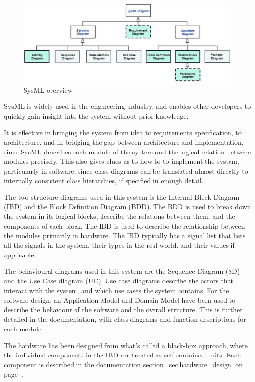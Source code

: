 \begin{figure}[H]
	\centering
	\includegraphics[max width=1\linewidth]{SysML.png}
	\caption{SysML overview\cite{SysML}}
	\label{fig:SysML}
\end{figure}

SysML is widely used in the engineering industry, and enables other developers to quickly gain insight into the system without prior knowledge. 

It is effective in bringing the system from idea to requirements specification, to architecture, and in bridging the gap between architecture and implementation, since SysML describes each module of the system and the logical relation between modules precisely. This also gives clues as to how to to implement the system, particularly in software, since class diagrams can be translated almost directly to internally consistent class hierarchies, if specified in enough detail.

The two structure diagrams used in this system is the Internal Block Diagram (IBD) and the Block Definition Diagram (BDD). The BDD is used to break down the system in its logical blocks, describe the relations between them, and the components of each block. The IBD is used to describe the relationship between the modules primarily in hardware. The IBD typically has a signal list that lists all the signals in the system, their types in the real world, and their values if applicable.

The behavioural diagrams used in this system are the Sequence Diagram (SD) and the Use Case diagram (UC). Use case diagrams describe the actors that interact with the system, and which use cases the system contains. For the software design, an Application Model and Domain Model have been used to describe the behaviour of the software and the overall structure. This is further detailed in the documentation, with class diagrams and function descriptions for each module.

The hardware has been designed from what's called a black-box approach, where the individual components in the IBD are treated as self-contained units. Each component is described in the documentation section~\ref{sec:hardware_design} on page~\pageref{sec:hardware_design}.


